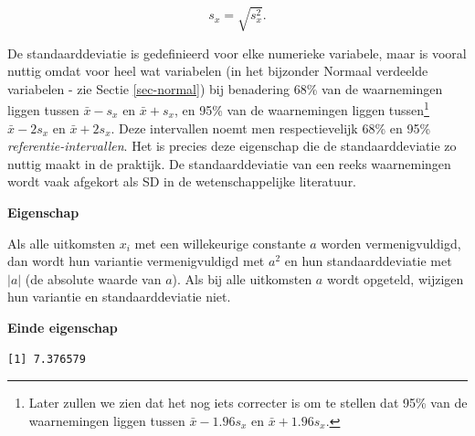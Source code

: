 \documentclass[
  dutch,
  letterpaper,
  12pt]{book}
\newenvironment{Shaded}{\begin{snugshade}}{\end{snugshade}}
\newcommand{\AttributeTok}[1]{\textcolor[rgb]{0.40,0.45,0.13}{#1}}
\newcommand{\CommentTok}[1]{\textcolor[rgb]{0.37,0.37,0.37}{#1}}
\newcommand{\ConstantTok}[1]{\textcolor[rgb]{0.56,0.35,0.01}{#1}}
\newcommand{\FunctionTok}[1]{\textcolor[rgb]{0.28,0.35,0.67}{#1}}
\newcommand{\NormalTok}[1]{\textcolor[rgb]{0.00,0.23,0.31}{#1}}
\newcommand{\SpecialCharTok}[1]{\textcolor[rgb]{0.37,0.37,0.37}{#1}}
\theoremstyle{definition}
\theoremstyle{definition}
\theoremstyle{definition}
\theoremstyle{remark}
\begin{document}
\begin{equation*}
s_x= \sqrt{s_x^2} .
\end{equation*}

De standaarddeviatie is gedefinieerd voor elke numerieke variabele, maar
is vooral nuttig omdat voor heel wat variabelen (in het bijzonder
Normaal verdeelde variabelen - zie Sectie \ref{sec-normal}) bij
benadering 68\% van de waarnemingen liggen tussen \(\bar{x} - s_x\) en
\(\bar{x} + s_x\), en 95\% van de waarnemingen liggen tussen\footnote{Later
  zullen we zien dat het nog iets correcter is om te stellen dat 95\%
  van de waarnemingen liggen tussen \(\bar{x} - 1.96 s_x\) en
  \(\bar{x} + 1.96 s_x\).} \(\bar{x} - 2 s_x\) en \(\bar{x} + 2 s_x\).
Deze intervallen noemt men respectievelijk 68\% en 95\%
\emph{referentie-intervallen}. Het is precies deze eigenschap die de
standaarddeviatie zo nuttig maakt in de praktijk. De standaarddeviatie
van een reeks waarnemingen wordt vaak afgekort als SD in de
wetenschappelijke literatuur.

\textbf{Eigenschap}

Als alle uitkomsten \(x_i\) met een willekeurige constante \(a\) worden
vermenigvuldigd, dan wordt hun variantie vermenigvuldigd met \(a^2\) en
hun standaarddeviatie met \(|a|\) (de absolute waarde van \(a\)). Als
bij alle uitkomsten \(a\) wordt opgeteld, wijzigen hun variantie en
standaarddeviatie niet.

\textbf{Einde eigenschap}

\begin{Shaded}
\end{Shaded}

\begin{verbatim}
[1] 7.376579
\end{verbatim}

\begin{Shaded}
\end{Shaded}
\end{document}
